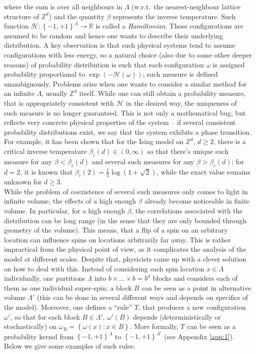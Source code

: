 \documentclass[12pt]{article}
\renewcommand{\H}{\mathcal{H}}
\newcommand{\R}{\mathbb{R}}
\newcommand{\Z}{\mathbb{Z}}
\newcommand{\set}[1]{\left\{#1\right\}}
\newcommand{\ra}{\rightarrow}
\newcommand{\1}{\mathbbm{1}}
\newcommand{\5}{\vspace{0.5cm}}
\theoremstyle{definition}
\begin{document}
where the sum is over all neighbours in $\Lambda$ (w.r.t.~the nearest-neighbour lattice structure of $\Z^d$) and the quantity $\beta$ represents the inverse temperature. Such function $\H:\set{-1,+1}^{\Lambda}\ra\R$ is called a \textit{Hamiltonian}. Those configurations are assumed to be random and hence one wants to describe their underlying distribution. A key observation is that such physical systems tend to assume configurations with less energy, so a natural choice (also due to some other deeper reasons) of probability distribution is such that each configuration $\omega$ is assigned probability proportional to $\exp(-\H(\omega))$; such measure is defined unambiguously. Problems arise when one wants to consider a similar method for an infinite $\Lambda$, usually $\Z^d$ itself. While one can still obtain a probability measure, that is appropriately consistent with $\H$ in the desired way, the uniqueness of such measure is no longer guaranteed. This is not only a mathematical bug, but reflects very concrete physical properties of the system -- if several consistent probability distributions exist, we say that the system exhibits a phase transition. For example, it has been shown that for the Ising model on $\Z^d$, $d\geq 2$, there is a critical inverse temperature $\beta_c(d)\in(0,\infty)$ so that there's unique such measure for any $\beta<\beta_c(d)$ and several such measures for any $\beta>\beta_c(d)$; for $d=2$, it is known that $\beta_c(2)=\frac{1}{2}\log(1+\sqrt{2})$, while the exact value remains unknown for $d\geq 3$. \\

While the problem of coexistence of several such measures only comes to light in infinite volume, the effects of a high enough $\beta$ already become noticeable in finite volume. In particular, for a high enough $\beta$, the correlations associated with the distribution can be long range (in the sense that they are only bounded through geometry of the volume). This means, that a flip of a spin on an arbitrary location can influence spins on locations arbitrarily far away. This is rather impractical from the physical point of view, as it complicates the analysis of the model at different scales. Despite that, physicists came up with a clever solution on how to deal with this. Instead of considering each spin location $x\in\Lambda$ individually, one partitions $\Lambda$ into $b\times\ldots\times b=b^d$ blocks and considers each of them as one individual super-spin; a block $B$ can be seen as a point in alternative volume $\Lambda'$ (this can be done in several different ways and depends on specifics of the model). Moreover, one defines a ``rule'' $T$, that produces a new configuration $\omega'$, so that for each block $B\in\Lambda'$, $\omega'(B)$ depends (deterministically or stochastically) on $\omega_B=\set{\omega(x):x\in B}$. More formally, $T$ can be seen as a probability kernel from $\set{-1,+1}^\Lambda$ to $\set{-1,+1}^{\Lambda'}$ (see Appendix \ref{app:1}). Below we give some examples of such rules:
\end{document}
